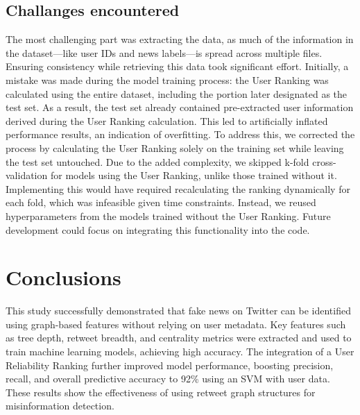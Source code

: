 \documentclass[11pt,a4paper]{article}
\begin{document}
\subsection*{Challanges encountered}
The most challenging part was extracting the data, as much of the information in the dataset—like user IDs and news labels—is spread across multiple files. Ensuring consistency while retrieving this data took significant effort. Initially, a mistake was made during the model training process: the User Ranking was calculated using the entire dataset, including the portion later designated as the test set. As a result, the test set already contained pre-extracted user information derived during the User Ranking calculation. This led to artificially inflated performance results, an indication of overfitting. To address this, we corrected the process by calculating the User Ranking solely on the training set while leaving the test set untouched. Due to the added complexity, we skipped k-fold cross-validation for models using the User Ranking, unlike those trained without it. Implementing this would have required recalculating the ranking dynamically for each fold, which was infeasible given time constraints. Instead, we reused hyperparameters from the models trained without the User Ranking. Future development could focus on integrating this functionality into the code.
\section*{Conclusions}
This study successfully demonstrated that fake news on Twitter can be identified using graph-based features without relying on user metadata. Key features such as tree depth, retweet breadth, and centrality metrics were extracted and used to train machine learning models, achieving high accuracy. The integration of a User Reliability Ranking further improved model performance, boosting precision, recall, and overall predictive accuracy to 92\% using an SVM with user data.
\\These results show the effectiveness of using retweet graph structures for misinformation detection.







\newpage
\end{document}
